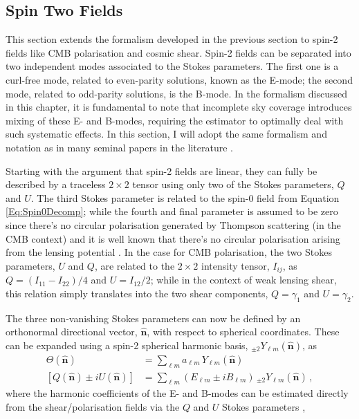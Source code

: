 \subsection{Spin Two Fields}\label{Sec:BPL:Spin-2_Form}
This section extends the formalism developed in the previous section to spin-2 fields like CMB polarisation and cosmic shear. Spin-2 fields can be separated into two independent modes associated to the Stokes parameters. The first one is a curl-free mode, related to even-parity solutions, known as the E-mode; the second mode, related to odd-parity solutions, is the B-mode. In the formalism discussed in this chapter, it is fundamental to note that incomplete sky coverage introduces mixing of these E- and B-modes, requiring the estimator to optimally deal with such systematic effects. In this section, I will adopt the same formalism and notation as in many seminal papers in the literature \citep{Seljak1997,Taylor2008,Hikage2011}.

\qquad Starting with the argument that spin-2 fields are linear, they can fully be described by a traceless $2 \times 2$ tensor using only two of the Stokes parameters, $Q$ and $U$. The third Stokes parameter is related to the spin-0 field from Equation \eqref{Eq:Spin0Decomp}; while the fourth and final parameter is assumed to be zero since there's no circular polarisation generated by Thompson scattering (in the CMB context) and it is well known that there's no circular polarisation arising from the lensing potential \citep{2005astro.ph..9252S,2017SchpJ..1232440B}. In the case for CMB polarisation, the two Stokes parameters, $U$ and $Q$, are related to the $2\times 2$ intensity tensor, $I_{ij}$, as $Q=(I_{11}-I_{22})/4$ and $U=I_{12}/2$; while in the context of weak lensing shear, this relation simply translates into the two shear components, $Q=\gamma_1$ and $U=\gamma_2$.

\qquad The three non-vanishing Stokes parameters can now be defined by an orthonormal directional vector, $\hat{\mathbf{n}}$, with respect to spherical coordinates. These can be expanded using a spin-2 spherical harmonic basis, $_{\pm 2}Y_{\ell m}(\hat{\mathbf{n}})$, as 
\begin{align}
\label{eqn::chCmbPol_stokes_paras}
\Theta(\hat{\mathbf{n}}) &= \sum_{\ell m}a_{\ell m}\,Y_{\ell m}(\hat{\mathbf{n}}) \\
\left[ Q(\hat{\mathbf{n}})\pm iU(\hat{\mathbf{n}}) \right] &= \sum_{\ell m}\left(E_{\ell m}\pm iB_{\ell m} \right)\,_{\pm 2}Y_{\ell m}(\hat{\mathbf{n}})\, ,
\end{align}
\noindent where the harmonic coefficients of the E- and B-modes can be estimated directly from the shear/polarisation fields via the $Q$ and $U$ Stokes parameters \citep{PolSpice2005,Hikage2011},

